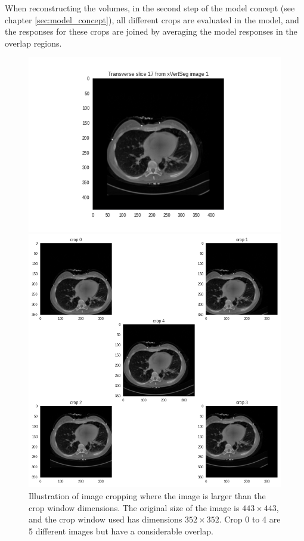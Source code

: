 When reconstructing the volumes, in the second step of the model concept (see chapter \ref{sec:model_concept}), 
all different crops are evaluated in the model, and the responses for these crops are joined by averaging the model responses in the overlap regions.

\begin{figure}
    \centering
    \begin{minipage}{.99\textwidth}
        \includegraphics[width=.99\textwidth]{images/slice017.png}
    \end{minipage} 
    \begin{minipage}{0.99\textwidth}
        \includegraphics[width=.99\textwidth]{images/cropping_slice017.png}
    \end{minipage}
    \caption{
        Illustration of image cropping where the image is larger than the crop window dimensions. The original size of the image is $443 \times 443$, and the crop window used has dimensions $352 \times 352$.
        Crop 0 to 4 are 5 different images but have a considerable overlap. \label{fig:crop}
        }
    
\end{figure}

